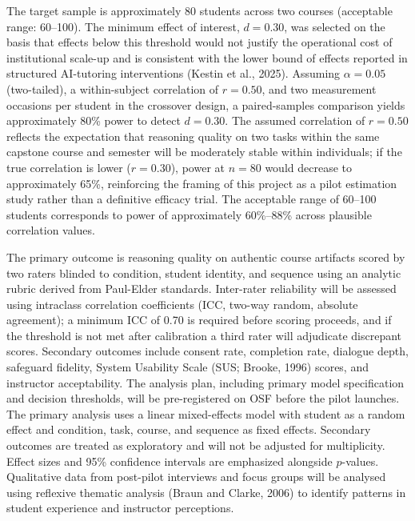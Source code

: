 \documentclass[11pt,a4paper]{article}
\begin{document}
The target sample is approximately 80 students across two courses (acceptable range: 60--100). The minimum effect of interest, $d = 0.30$, was selected on the basis that effects below this threshold would not justify the operational cost of institutional scale-up and is consistent with the lower bound of effects reported in structured AI-tutoring interventions (Kestin et al., 2025). Assuming $\alpha = 0.05$ (two-tailed), a within-subject correlation of $r = 0.50$, and two measurement occasions per student in the crossover design, a paired-samples comparison yields approximately 80\% power to detect $d = 0.30$. The assumed correlation of $r = 0.50$ reflects the expectation that reasoning quality on two tasks within the same capstone course and semester will be moderately stable within individuals; if the true correlation is lower ($r = 0.30$), power at $n = 80$ would decrease to approximately 65\%, reinforcing the framing of this project as a pilot estimation study rather than a definitive efficacy trial. The acceptable range of 60--100 students corresponds to power of approximately 60\%--88\% across plausible correlation values.

The primary outcome is reasoning quality on authentic course artifacts scored by two raters blinded to condition, student identity, and sequence using an analytic rubric derived from Paul-Elder standards. Inter-rater reliability will be assessed using intraclass correlation coefficients (ICC, two-way random, absolute agreement); a minimum ICC of 0.70 is required before scoring proceeds, and if the threshold is not met after calibration a third rater will adjudicate discrepant scores. Secondary outcomes include consent rate, completion rate, dialogue depth, safeguard fidelity, System Usability Scale (SUS; Brooke, 1996) scores, and instructor acceptability. The analysis plan, including primary model specification and decision thresholds, will be pre-registered on OSF before the pilot launches. The primary analysis uses a linear mixed-effects model with student as a random effect and condition, task, course, and sequence as fixed effects. Secondary outcomes are treated as exploratory and will not be adjusted for multiplicity. Effect sizes and 95\% confidence intervals are emphasized alongside $p$-values. Qualitative data from post-pilot interviews and focus groups will be analysed using reflexive thematic analysis (Braun and Clarke, 2006) to identify patterns in student experience and instructor perceptions.
\end{document}
